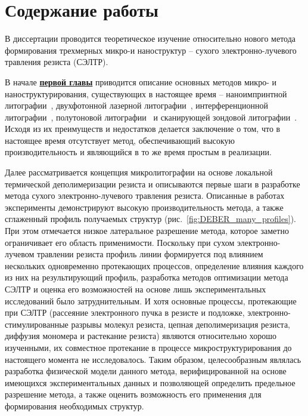 \chapter*{Содержание работы}
В диссертации проводится теоретическое изучение относительно нового метода формирования трехмерных микро-и наноструктур -- сухого электронно-лучевого травления резиста (СЭЛТР). 

В начале \underline{\textbf{первой главы}} приводится описание основных методов микро- и наноструктурирования, существующих в настоящее время -- наноимпринтной литографии~\cite{NIL_1}, двухфотонной лазерной литографии~\cite{TPL_castle}, интерференционной литографии~\cite{IL_metamaterials}, полутоновой литографии~\cite{GL_general} и сканирующей зондовой литографии~\cite{SPL_mechanical}. Исходя из их преимуществ и недостатков делается заключение о том, что в настоящее время отсутствует метод, обеспечивающий высокую производительность и являющийся в то же время простым в реализации.

Далее рассматривается концепция микролитографии на основе локальной термической деполимеризации резиста и описываются первые шаги в разработке метода сухого электронно-лучевого травления резиста. Описанные в работах~\cite{Bruk_2013, Bruk_2016_mee} эксперименты демонстрируют высокую производительность метода, а также сглаженный профиль получаемых структур (рис.~\ref{fig:DEBER_many_profiles}). При этом отмечается низкое латеральное разрешение метода, которое заметно ограничивает его область применимости. Поскольку при сухом электронно-лучевом травлении резиста профиль линии формируется под влиянием нескольких одновременно протекающих процессов, определение влияния каждого из них на результирующий профиль, разработка методов оптимизации метода СЭЛТР и оценка его возможностей на основе лишь экспериментальных исследований было затруднительным. И хотя основные процессы, протекающие при СЭЛТР (рассеяние электронного пучка в резисте и подложке, электронно-стимулированные разрывы молекул резиста, цепная деполимеризация резиста, диффузия мономера и растекание резиста) являются относительно хорошо изученными, их совместное протекание в процессе микроструктурирования до настоящего момента не исследовалось. Таким образом, целесообразным являлась разработка физической модели данного метода, верифицированной на основе имеющихся экспериментальных данных и позволяющей определить предельное разрешение метода, а также оценить возможность его применения для формирования необходимых структур.

